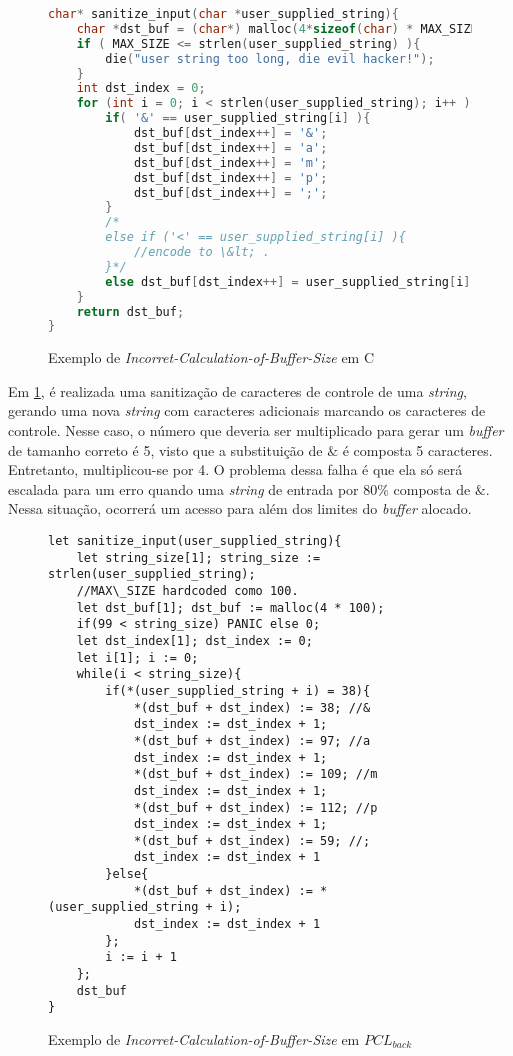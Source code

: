\begin{figure}[ht]
	\caption{Exemplo de \emph{Incorret-Calculation-of-Buffer-Size} em C}
	\label{lst:c:spacial}
	\begin{lstlisting}[language=C]
char* sanitize_input(char *user_supplied_string){
	char *dst_buf = (char*) malloc(4*sizeof(char) * MAX_SIZE);  
	if ( MAX_SIZE <= strlen(user_supplied_string) ){
		die("user string too long, die evil hacker!");
	}  
	int dst_index = 0;  
	for (int i = 0; i < strlen(user_supplied_string); i++ ){
		if( '&' == user_supplied_string[i] ){
			dst_buf[dst_index++] = '&';  
			dst_buf[dst_index++] = 'a';  
			dst_buf[dst_index++] = 'm';  
			dst_buf[dst_index++] = 'p';  
			dst_buf[dst_index++] = ';';
		}
		/*  
		else if ('<' == user_supplied_string[i] ){
			//encode to \&lt; .
		}*/  
		else dst_buf[dst_index++] = user_supplied_string[i];
	}  
	return dst_buf;
}
	\end{lstlisting}
\end{figure}
\FloatBarrier

Em \ref{lst:c:spacial}, é realizada uma sanitização de caracteres de controle de uma \emph{string}, gerando uma nova \emph{string} com caracteres adicionais marcando os caracteres de controle. Nesse caso, o número que deveria ser multiplicado para gerar um \emph{buffer} de tamanho correto é 5, visto que a substituição de $\&$ é composta 5 caracteres. Entretanto, multiplicou-se por 4. O problema dessa falha é que ela só será escalada para um erro quando uma \emph{string} de entrada por $80\%$ composta de $\&$. Nessa situação, ocorrerá um acesso para além dos limites do \emph{buffer} alocado.

\begin{figure}[ht]
	\caption{Exemplo de \emph{Incorret-Calculation-of-Buffer-Size} em $PCL_{back}$}
	\label{lst:pclback:spacial}
	\begin{lstlisting}[language=PCLback]
let sanitize_input(user_supplied_string){
	let string_size[1]; string_size := strlen(user_supplied_string);
	//MAX\_SIZE hardcoded como 100.
	let dst_buf[1]; dst_buf := malloc(4 * 100); 
	if(99 < string_size) PANIC else 0;
	let dst_index[1]; dst_index := 0;
	let i[1]; i := 0;
	while(i < string_size){
		if(*(user_supplied_string + i) = 38){
			*(dst_buf + dst_index) := 38; //&
			dst_index := dst_index + 1;
			*(dst_buf + dst_index) := 97; //a
			dst_index := dst_index + 1;
			*(dst_buf + dst_index) := 109; //m
			dst_index := dst_index + 1;
			*(dst_buf + dst_index) := 112; //p
			dst_index := dst_index + 1;
			*(dst_buf + dst_index) := 59; //;
			dst_index := dst_index + 1
		}else{
			*(dst_buf + dst_index) := *(user_supplied_string + i);
			dst_index := dst_index + 1
		};
		i := i + 1
	};
	dst_buf
}
	\end{lstlisting}
\end{figure}
\FloatBarrier

